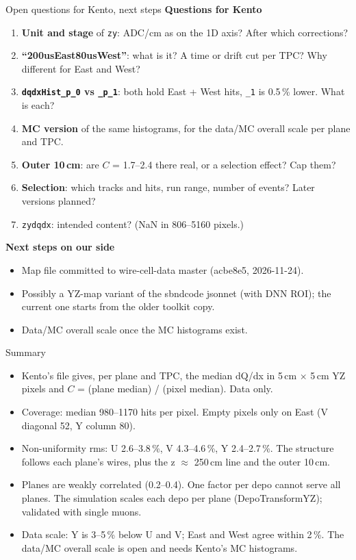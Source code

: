 \documentclass[aspectratio=169,10pt]{beamer}
\newcommand{\code}[1]{\texttt{#1}}
\begin{document}
\begin{frame}{Open questions for Kento, next steps}
\small
\textbf{Questions for Kento}
\begin{enumerate}
\item \textbf{Unit and stage} of \code{zy}: ADC/cm as on the 1D axis? After which corrections?
\item \textbf{``200usEast80usWest''}: what is it? A time or drift cut per TPC? Why different for East and West?
\item \textbf{\code{dqdxHist\_p\_0} vs \code{\_p\_1}}: both hold East + West hits, \code{\_1} is 0.5\,\% lower. What is each?
\item \textbf{MC version} of the same histograms, for the data/MC overall scale per plane and TPC.
\item \textbf{Outer 10\,cm}: are $C$ = 1.7--2.4 there real, or a selection effect? Cap them?
\item \textbf{Selection}: which tracks and hits, run range, number of events? Later versions planned?
\item \code{zydqdx}: intended content? (NaN in 806--5160 pixels.)
\end{enumerate}
\vspace{2mm}
\textbf{Next steps on our side}
\begin{itemize}
\item Map file committed to wire-cell-data master (acbe8e5, 2026-11-24).
\item Possibly a YZ-map variant of the sbndcode jsonnet (with DNN ROI); the current one starts from the older toolkit copy.
\item Data/MC overall scale once the MC histograms exist.
\end{itemize}
\end{frame}

\begin{frame}{Summary}
\begin{itemize}
\item Kento's file gives, per plane and TPC, the median dQ/dx in 5\,cm $\times$ 5\,cm YZ pixels and $C$ = (plane median) / (pixel median). Data only.
\item Coverage: median 980--1170 hits per pixel. Empty pixels only on East (V diagonal 52, Y column 80).
\item Non-uniformity rms: U 2.6--3.8\,\%, V 4.3--4.6\,\%, Y 2.4--2.7\,\%. The structure follows each plane's wires, plus the z $\approx$ 250\,cm line and the outer 10\,cm.
\item Planes are weakly correlated (0.2--0.4). One factor per depo cannot serve all planes. The simulation scales each depo per plane (DepoTransformYZ); validated with single muons.
\item Data scale: Y is 3--5\,\% below U and V; East and West agree within 2\,\%. The data/MC overall scale is open and needs Kento's MC histograms.
\end{itemize}
\end{frame}
\end{document}
